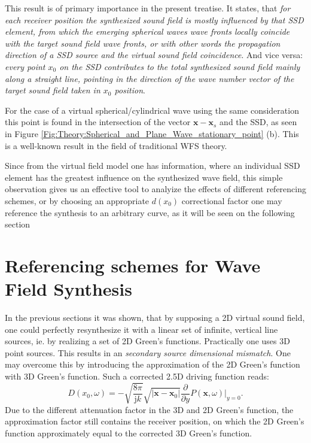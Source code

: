 \documentclass[12pt,a4paper]{article}
\newcommand{\ti}{\mathrm{j}}
\newcommand{\vx}{\mathbf{x}}
\newcommand{\vxo}{\mathbf{x}_0}
\begin{document}
\vspace{3mm}
This result is of primary importance in the present treatise. It states, that \emph{for each receiver position the synthesized sound field is mostly influenced by that SSD element, from which the emerging spherical waves wave fronts locally coincide with the target sound field wave fronts, or with other words the propagation direction of a SSD source and the virtual sound field coincidence}. And vice versa: \emph{every point $x_0$ on the SSD contributes to the total synthesized sound field mainly along a straight line, pointing in the direction of the wave number vector of the target sound field taken in $x_0$ position}. 

For the case of a virtual spherical/cylindrical wave using the same consideration this point is found in the intersection of the vector $ \vx - \mathbf{x}_s $ and the SSD, as seen in Figure \ref{Fig:Theory:Spherical_and_Plane_Wave_stationary_point} (b). This is a well-known result in the field of traditional WFS theory.

Since from the virtual field model one has information, where an individual SSD element has the greatest influence on the synthesized wave field, this simple observation gives us an effective tool to analyize the effects of different referencing schemes, or by choosing an appropriate $d(x_0)$ correctional factor one may reference the synthesis to an arbitrary curve, as it will be seen on the following section


\section{Referencing schemes for Wave Field Synthesis}

In the previous sections it was shown, that by supposing a 2D virtual sound field, one could perfectly resynthesize it with a linear set of infinite, vertical line sources, ie. by realizing a set of 2D Green's functions. Practically one uses 3D point sources. This results in an \emph{secondary source dimensional mismatch}. One may overcome this by introducing the approximation of the 2D Green's function with 3D Green's function. Such a corrected 2.5D driving function reads:
\begin{equation}
D(x_0,\omega) = 
- \sqrt{\frac{8\pi}{\ti k}} \sqrt{|\vx-\vxo|} \frac{\partial}{\partial y} \left. P(\vx,\omega) \right|_{y = 0}.
\end{equation}
Due to the different attenuation factor in the 3D and 2D Green's function, the approximation factor still contains the receiver position, on which the 2D Green's function approximately equal to the corrected 3D Green's function. 
\end{document}
